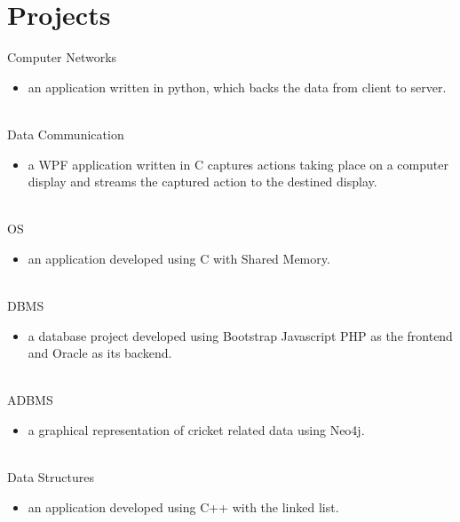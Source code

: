 \documentclass[letterpaper]{Baseclass}
\begin{document}
\section{Projects}

\begin{envvar} 
	\envvaritem
	{Computer}
	{Networks}
	{\hspace{0.3cm}{Data Stacker}}
	{}
	{}
	{\begin{itemize}
			\item an application written in python, which backs the data from client to server.      
	\end{itemize}}
	\\
	\envvaritem
	{Data}
	{Communication}
	{\hspace{0.3cm}{Real Time}}
	{}
	{}
	{
	{\begin{itemize}
			\item a WPF application written in C captures actions taking place on a computer display and streams the captured action to the destined display.
	\end{itemize} }
	}
	\\
	\envvaritem
	{OS}
	{}
	{\hspace{0.3cm}{Process Docketing}}
	{}
	{}
	{
		{\begin{itemize}
				\item  an application developed using C with Shared Memory.
		\end{itemize}}
	}
	\\
	\envvaritem
	{DBMS}
	{}
	{\hspace{0.3cm}{SwiftX}}
	{}
	{}
	{
		{\begin{itemize}
				\item a database project developed using Bootstrap Javascript PHP as the frontend and Oracle as its backend.
		\end{itemize}}
	}
    \\
	\envvaritem
	{ADBMS}
	{}
	{\hspace{0.3cm}{CricPlot}}
	{}
	{}
	{
		{\begin{itemize}
				\item a graphical representation of cricket related data using Neo4j.
		\end{itemize}}
	}
    \\
	\envvaritem
	{Data}
	{Structures}
	{\hspace{0.3cm}{RemindME}}
	{}
	{}
	{
		{\begin{itemize}
				\item an application developed using C++ with the linked list.
		\end{itemize}}
	}
	
\end{envvar}
\end{document}
